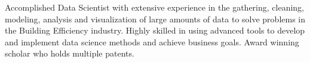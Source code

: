 

\begin{cvparagraph}

Accomplished Data Scientist with extensive experience in the gathering, cleaning, modeling, analysis and visualization of large amounts of data to solve problems in the Building Efficiency industry. Highly skilled in using advanced tools to develop and implement data science methods and achieve business goals. Award winning scholar who holds multiple patents.

\end{cvparagraph}
